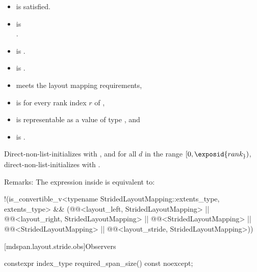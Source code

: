 \begin{itemdescr}
\pnum
\constraints
\begin{itemize}
\item
{} is satisfied.
\item
{} is\\.
\item
{} is .
\item
{} is .
\end{itemize}

\pnum
\expects
\begin{itemize}
\item
{} meets the layout mapping requirements,
\item
{} is 
for every rank index $r$ of ,
\item
{} is representable as
a value of type , and
\item
{} is .
\end{itemize}

\pnum
\effects
Direct-non-list-initializes  with , and
for all $d$ in the range $[0, \exposid{rank_})$,
direct-non-list-initializes 
with .

\pnum
Remarks: The expression inside  is equivalent to:
\begin{codeblock}
!(is_convertible_v<typename StridedLayoutMapping::extents_type, extents_type> &&
  (@@<layout_left, StridedLayoutMapping> ||
   @@<layout_right, StridedLayoutMapping> ||
   @@<StridedLayoutMapping> ||
   @@<StridedLayoutMapping> ||
   @@<layout_stride, StridedLayoutMapping>))
\end{codeblock}
\end{itemdescr}

[mdspan.layout.stride.obs]{Observers}

%
\begin{itemdecl}
constexpr index_type required_span_size() const noexcept;
\end{itemdecl}

